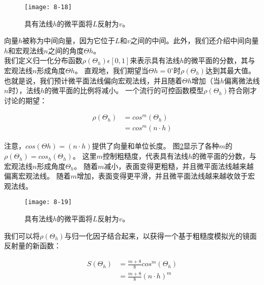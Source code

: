 \begin{figure}[h]
    \texttt{[image: 8-18]}
    \centering
    \caption{具有法线$h$的微平面将$L$反射为$v$。}
    \label{fig:8-18}
\end{figure}

\begin{flushleft}
向量$h$被称为中间向量，因为它位于$L$和$v$之间的中间。此外，我们还介绍中间向量$h$和宏观法线$n$之间的角度$\Theta h$。\\

我们定义归一化分布函数$\rho(\Theta_{h})\epsilon [0,1]$来表示具有法线$h$的微平面的分数，其与宏观法线$n$形成角度$\Theta h$。 直观地，我们期望当$\Theta h=0^{\circ}$时$\rho(\Theta_{h})$达到其最大值。 也就是说，我们预计微平面法线偏向宏观法线，并且随着$\Theta h$增加（当$h$偏离微法线$n$时），法线$h$的微平面的比例将减小。 一个流行的可控函数模型$\rho(\Theta_{h})$符合刚才讨论的期望：\\
\end{flushleft}

\begin{align*}
\rho(\Theta_{h})&=cos^{m}(\Theta_{h})\\
&=cos^{m}(n\cdot h)
\end{align*}

\begin{flushleft}
注意，$cos(\Theta h)=(n\cdot h)$提供了向量和单位长度。 图\ref{fig:8-19}显示了各种$m$的$\rho(\Theta_{h})=cos_{h}(\Theta_{h})$。 这里$m$控制粗糙度，代表具有法线$h$的微平面的分数，与宏观法线$n$形成角度$\Theta_{h}$。 随着$m$减小，表面变得更粗糙，并且微平面法线越来越偏离宏观法线。 随着$m$增加，表面变得更平滑，并且微平面法线越来越收敛于宏观法线。
\end{flushleft}

\begin{figure}[h]
    \texttt{[image: 8-19]}
    \centering
    \caption{具有法线$h$的微平面将$L$反射为$v$。}
    \label{fig:8-19}
\end{figure}

\begin{flushleft}
我们可以将$\rho(\Theta_{h})$与归一化因子结合起来，以获得一个基于粗糙度模拟光的镜面反射量的新函数：\\
\end{flushleft}

\begin{align*}
S(\Theta_{h})&=\frac{m+8}{8}cos^{m}(\Theta_{h})\\
&=\frac{m+8}{8}(n\cdot h)^{m}
\end{align*}


